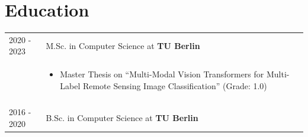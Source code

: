 \documentclass[a4paper,13pt]{article}
\begin{document}
\vspace{10pt}



\section{Education}
\begin{tabularx}{\linewidth}{@{}l X@{}}	
2020 - 2023 & M.Sc. in Computer Science at \textbf{TU Berlin} %
\\ 

& \begin{minipage}[t]{\linewidth}
    \begin{itemize}[nosep,after=\strut, leftmargin=1em, itemsep=3pt]
        \item[\small{$\bullet$}] \normalsize{Master Thesis on \enquote{Multi-Modal Vision Transformers for Multi-Label Remote Sensing Image Classification}} (Grade: 1.0)
    \end{itemize}
    \end{minipage} \\
&\\
2016 - 2020 & B.Sc. in Computer Science at \textbf{TU Berlin} \hfill \\ 


\end{tabularx}
\vspace{10pt}
\end{document}
